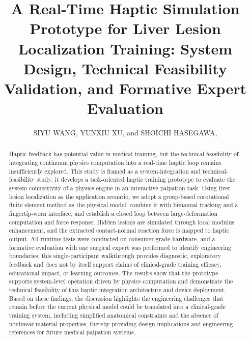 \documentclass{ieeeaccess}
\begin{document}

\title{A Real-Time Haptic Simulation Prototype for Liver Lesion Localization Training: System Design, Technical Feasibility Validation, and Formative Expert Evaluation}
\author{\uppercase{Siyu Wang},
\uppercase{Yunxiu Xu},
and \uppercase{Shoichi Hasegawa}, }
\address[1]{Department of Information and Communication Engineering, Institute of Science Tokyo, Yokohama, Japan (e-mail: siw131@haselab.net, yunxiu@haselab.net, hasevr@haselab.net)}

\begin{abstract}
Haptic feedback has potential value in medical training, but the technical feasibility of integrating continuum physics computation into a real-time haptic loop remains insufficiently explored. This study is framed as a system-integration and technical-feasibility study: it develops a task-oriented haptic training prototype to evaluate the system connectivity of a physics engine in an interactive palpation task. Using liver lesion localization as the application scenario, we adopt a group-based corotational finite element method as the physical model, combine it with bimanual tracking and a fingertip-worn interface, and establish a closed loop between large-deformation computation and force response. Hidden lesions are simulated through local modulus enhancement, and the extracted contact-normal reaction force is mapped to haptic output. All runtime tests were conducted on consumer-grade hardware, and a formative evaluation with one surgical expert was performed to identify engineering boundaries; this single-participant walkthrough provides diagnostic, exploratory feedback and does not by itself support claims of clinical-grade training efficacy, educational impact, or learning outcomes. The results show that the prototype supports system-level operation driven by physics computation and demonstrate the technical feasibility of this haptic integration architecture and device deployment. Based on these findings, the discussion highlights the engineering challenges that remain before the current physical model could be translated into a clinical-grade training system, including simplified anatomical constraints and the absence of nonlinear material properties, thereby providing design implications and engineering references for future medical palpation systems.
\end{abstract}
\end{document}
